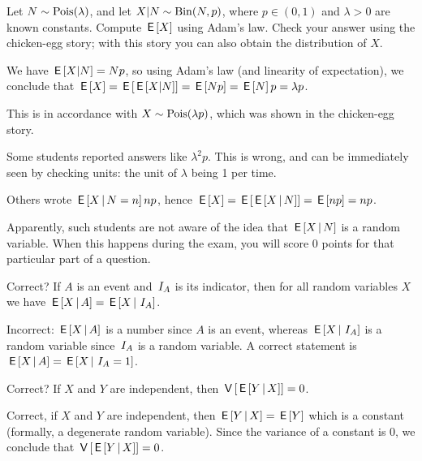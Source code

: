\begin{exercise}
Let $N \sim \mathrm{Pois}(\lambda)$, and let $X|N \sim \mathrm{Bin}(N, p)$, where $p \in (0,1)$ and $\lambda > 0$ are known constants.
Compute $\,\mathsf{E}\left[X\right]$ using Adam's law.
Check your answer using the chicken-egg story; with this story you can also obtain the distribution of $X$.
\begin{solution}
We have $\,\mathsf{E}\left[X|N\right] = Np$, so using Adam's law (and linearity of expectation), we conclude that $\,\mathsf{E}\left[X\right] = \,\mathsf{E}\left[\,\mathsf{E}\left[X|N\right]\right] = \,\mathsf{E}\left[Np\right] = \,\mathsf{E}\left[N\right]p = \lambda p$.

This is in accordance with $X \sim \mathrm{Pois}(\lambda p)$, which was shown in the chicken-egg story.

Some students reported answers like $\lambda^{2}p$. This is wrong, and can be immediately seen by checking units: the unit of $\lambda$ being 1 per time.

Others wrote $\,\mathsf{E}\left[X\,\middle|\, N= n\right] n p$, hence $\,\mathsf{E}\left[X\right] = \,\mathsf{E}\left[\,\mathsf{E}\left[X\,\middle|\, N\right]\right]= \,\mathsf{E}\left[np\right] = np$.

Apparently, such students are not aware of the idea that $\,\mathsf{E}\left[X\,\middle|\, N\right]$ is a random variable.
When this happens during the exam, you will score 0 points for that particular part of a question.

\end{solution}
\end{exercise}


\begin{exercise}
Correct? If $A$ is an event and $\,I_{A}$ is its indicator, then for all random variables $X$ we have $\,\mathsf{E}\left[X \,\middle|\, A\right] = \,\mathsf{E}\left[X \,\middle|\, \,I_{A}\right]$.
\begin{solution}
Incorrect:  $\,\mathsf{E}\left[X \,\middle|\, A\right]$ is a number since $A$ is an event, whereas $\,\mathsf{E}\left[X \,\middle|\, \,I_{A}\right]$ is a random variable since $\,I_{A}$ is a random variable. A correct statement is $\,\mathsf{E}\left[X \,\middle|\, A\right] = \,\mathsf{E}\left[X \,\middle|\, \,I_{A} = 1\right]$.
\end{solution}
\end{exercise}

\begin{exercise}
Correct? If $X$ and $Y$ are independent, then $\,\mathsf{V}\left[\,\mathsf{E}\left[Y \,\middle|\, X\right]\right] = 0$.
\begin{solution}
Correct, if  $X$ and $Y$ are independent, then $\,\mathsf{E}\left[Y \,\middle|\, X\right] = \,\mathsf{E}\left[Y\right]$ which is a constant (formally, a degenerate random variable).
Since the variance of a constant is 0, we conclude that $\,\mathsf{V}\left[\,\mathsf{E}\left[Y \,\middle|\, X\right]\right] = 0$.
\end{solution}
\end{exercise}

